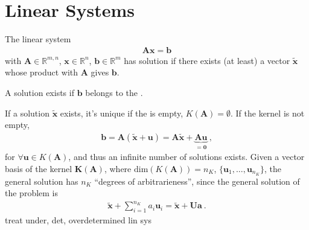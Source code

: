 \documentclass[letterpaper,10pt,english]{jupyterBook}
\begin{document}
\sphinxstepscope


\chapter{Linear Systems}
\label{\detokenize{ch/linear-algebra/linear-systems:linear-systems}}\label{\detokenize{ch/linear-algebra/linear-systems:math-linear-algebra-linear-sys}}\label{\detokenize{ch/linear-algebra/linear-systems::doc}}
\sphinxAtStartPar
The linear system
\begin{equation*}
\begin{split}\mathbf{A} \mathbf{x} = \mathbf{b}\end{split}
\end{equation*}
\sphinxAtStartPar
with \(\mathbf{A} \in \mathbb{R}^{m,n}\), \(\mathbf{x} \in \mathbb{R}^n\), \(\mathbf{b} \in \mathbb{R}^m\) has solution if there exists (at least) a vector \(\widetilde{\mathbf{x}}\) whose product with \(\mathbf{A}\) gives \(\mathbf{b}\).

\sphinxAtStartPar
{}
A solution exists if \(\mathbf{b}\) belongs to the {\hyperref[\detokenize{ch/linear-algebra/matrices:math-linear-algebra-matrix-subspaces-range}]{}}.

\sphinxAtStartPar
{} If a solution \(\widetilde{\mathbf{x}}\) exists, it’s unique if the {\hyperref[\detokenize{ch/linear-algebra/matrices:math-linear-algebra-matrix-subspaces-null}]{}} is empty, \(K(\mathbf{A}) = \emptyset\). If the kernel is not empty,
\begin{equation*}
\begin{split}\mathbf{b} = \mathbf{A}(\widetilde{\mathbf{x}} + \mathbf{u}) =  \mathbf{A}\widetilde{\mathbf{x}} + \underbrace{\mathbf{A} \mathbf{u}}_{=\mathbf{0}} \ ,\end{split}
\end{equation*}
\sphinxAtStartPar
for \(\forall \mathbf{u} \in K(\mathbf{A})\), and thus an infinite number of solutions exists. Given a vector basis of the kernel \(\mathbf{K}(\mathbf{A})\), where \(\text{dim}\left( K(\mathbf{A}) \right) = n_K\), \(\{ \mathbf{u}_1, \dots, \mathbf{u}_{n_K} \}\), the general solution has \(n_K\) “degrees of arbitrarieness”, since the general solution of the problem is
\begin{equation*}
\begin{split}\widetilde{\mathbf{x}} + \sum_{i = 1}^{n_K} a_i \mathbf{u}_i = \widetilde{\mathbf{x}} + \mathbf{U} \mathbf{a} \ .\end{split}
\end{equation*}
\sphinxAtStartPar
{} treat under\sphinxhyphen{}, det\sphinxhyphen{}, over\sphinxhyphen{}determined lin sys
\end{document}
